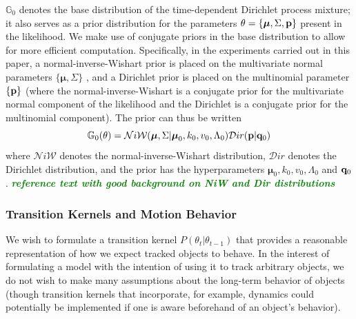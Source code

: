 \documentclass{article}
\newcommand{\willie}[1]{\textcolor{green}{\textsf{\emph{\textbf{\textcolor{green}{#1}}}}}}
\begin{document}
$\mathbb{G}_{0}$ denotes the base distribution of the time-dependent Dirichlet process mixture; it also serves as a prior distribution for the parameters $\theta = \{ \boldsymbol{\mu}, \Sigma, \bold{p} \}$ present in the likelihood. We make use of conjugate priors in the base distribution to allow for more efficient computation. Specifically, in the experiments carried out in this paper, a normal-inverse-Wishart prior is placed on the multivariate normal parameters $\{ \boldsymbol{\mu}, \Sigma \}$ , and a Dirichlet prior is placed on the multinomial parameter $ \{  \bold{p}  \} $ (where the normal-inverse-Wishart is a conjugate prior for the multivariate normal component of the likelihood and the Dirichlet is a conjugate prior for the multinomial component). The prior can thus be written
\begin{equation}
\mathbb{G}_{0}(\theta) = \mathcal{N}i\mathcal{W}(\boldsymbol{\mu}, \Sigma | \boldsymbol{\mu}_{0}, k_{0}, v_{0}, \Lambda_{0})  \mathcal{D}ir( \bold{p} | \bold{q}_{0})
\end{equation}
where $\mathcal{N}i\mathcal{W}$ denotes the normal-inverse-Wishart distribution, $\mathcal{D}ir$ denotes the Dirichlet distribution, and the prior has the hyperparameters $\boldsymbol{\mu}_{0}, k_{0}, v_{0}, \Lambda_{0}$ and $\bold{q}_{0}$.  \willie{reference text with good background on NiW and Dir distributions}



\subsubsection{Transition Kernels and Motion Behavior}

We wish to formulate a transition kernel $P(\theta_{t} | \theta_{t-1})$ that provides a reasonable representation of how we expect tracked objects to behave. In the interest of formulating a model with the intention of using it to track arbitrary objects, we do not wish to make many assumptions about the long-term behavior of objects (though transition kernels that incorporate, for example, dynamics could potentially be implemented if one is aware beforehand of an object's behavior).
\end{document}
